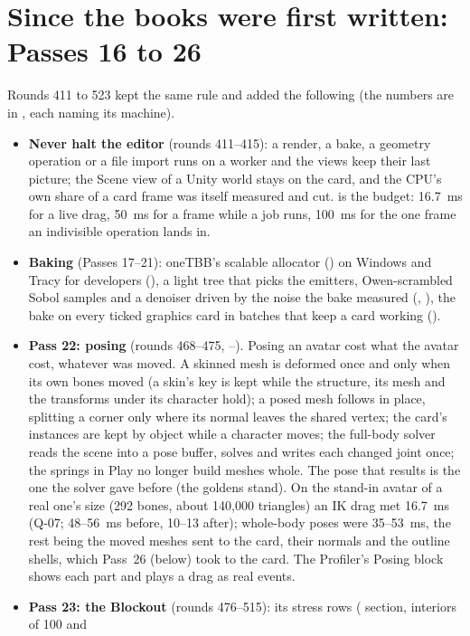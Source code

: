 \section{Since the books were first written: Passes 16 to 26}
Rounds 411 to 523 kept the same rule and added the following (the numbers are in , each naming its
machine).
\begin{itemize}
  \item \textbf{Never halt the editor} (rounds 411--415): a render, a bake, a geometry operation or a file import runs on a
    worker and the views keep their last picture; the Scene view of a Unity world stays on the card, and the CPU's own
    share of a card frame was itself measured and cut.  is the budget: 16.7~ms for a live drag, 50~ms for a frame
    while a job runs, 100~ms for the one frame an indivisible operation lands in.
  \item \textbf{Baking} (Passes 17--21): oneTBB's scalable allocator () on Windows and Tracy for developers (), a light
    tree that picks the emitters, Owen-scrambled Sobol samples and a denoiser driven by the noise the bake measured
    (, ), the bake on every ticked graphics card in batches that keep a card working ().
  \item \textbf{Pass 22: posing} (rounds 468--475, --). Posing an avatar cost what the avatar cost,
    whatever was moved. A skinned mesh is deformed once and only when its own bones moved (a skin's key is kept while the
    structure, its mesh and the transforms under its character hold); a posed mesh follows in place, splitting a corner
    only where its normal leaves the shared vertex; the card's instances are kept by object while a character moves; the
    full-body solver reads the scene into a pose buffer, solves and writes each changed joint once; the springs in Play
    no longer build meshes whole. The pose that results is the one the solver gave before (the goldens stand). On the
    stand-in avatar of a real one's size (292 bones, about 140{,}000 triangles) an IK drag met 16.7~ms (Q-07; 48--56~ms
    before, 10--13 after); whole-body poses were 35--53~ms, the rest being the moved meshes sent to the card, their
    normals and the outline shells, which Pass~26 (below) took to the card. The Profiler's Posing
    block shows each part and  plays a drag as real events.
  \item \textbf{Pass 23: the Blockout} (rounds 476--515): its stress rows ( section, interiors of 100 and

\end{itemize}
